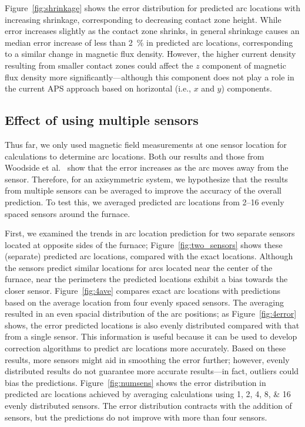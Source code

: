 \documentclass[onehalf,11pt]{beavtex}
\begin{document}
Figure~\ref{fig:shrinkage} shows the error distribution for predicted arc locations with increasing shrinkage, corresponding to decreasing contact zone height.
While error increases slightly as the contact zone shrinks, in general shrinkage causes an median error increase of less than \SI{2}{\percent} in predicted arc locations, corresponding to a similar change in magnetic flux density.
However, the higher current density resulting from smaller contact zones could affect the $z$ component of magnetic flux density more significantly---although this component does not play a role in the current APS approach based on horizontal (i.e., $x$ and $y$) components.

\subsection{Effect of using multiple sensors}
\label{sec:multiple_sensors}

Thus far, we only used magnetic field measurements at one sensor location for calculations to determine arc locations. 
Both our results and those from Woodside et al.~\cite{Woodside:2010fi,Woodside:2013cf} show that the error increases as the arc moves away from the sensor. 
Therefore, for an axisymmetric system, we hypothesize that the results from multiple sensors can be averaged to improve the accuracy of the overall prediction.
To test this, we averaged predicted arc locations from \numrange{2}{16} evenly spaced sensors around the furnace.

First, we examined the trends in arc location prediction for two separate sensors located at opposite sides of the furnace; Figure~\ref{fig:two_sensors} shows these (separate) predicted arc locations, compared with the exact locations.
Although the sensors predict similar locations for arcs located near the center of the furnace, near the perimeters the predicted locations exhibit a bias towards the closer sensor.
Figure~\ref{fig:4ave} compares exact arc locations with predictions based on the average location from four evenly spaced sensors.
The averaging resulted in an even spacial distribution of the arc positions; as Figure~\ref{fig:4error} shows, the error predicted locations is also evenly distributed compared with that from a single sensor.
This information is useful because it can be used to develop correction algorithms to predict arc locations more accurately.
Based on these results, more sensors might aid in smoothing the error further; however, evenly distributed results do not guarantee more accurate results---in fact, outliers could bias the predictions.
Figure~\ref{fig:numsens} shows the error distribution in predicted arc locations achieved by averaging calculations using \numlist{1;2;4;8;16} evenly distributed sensors.
The error distribution contracts with the addition of sensors, but the predictions do not improve with more than four sensors.
\end{document}
